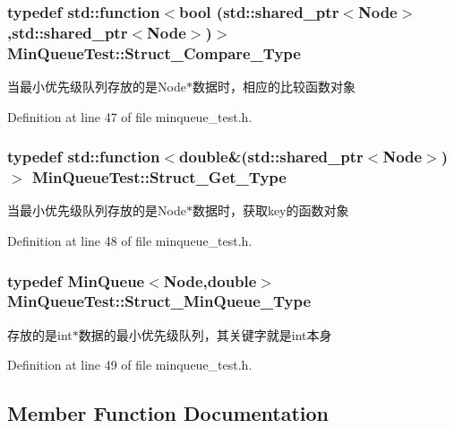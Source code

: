 \subsubsection[{Struct\+\_\+\+Compare\+\_\+\+Type}]{\setlength{\rightskip}{0pt plus 5cm}typedef std\+::function$<$bool (std\+::shared\+\_\+ptr$<${\bf Node}$>$,std\+::shared\+\_\+ptr$<${\bf Node}$>$)$>$ {\bf Min\+Queue\+Test\+::\+Struct\+\_\+\+Compare\+\_\+\+Type}}\label{class_min_queue_test_a25bfd5b74968c587db57133f107a5f61}
当最小优先级队列存放的是\+Node$\ast$数据时，相应的比较函数对象 

Definition at line 47 of file minqueue\+\_\+test.\+h.

\hypertarget{class_min_queue_test_aebcf6172ed7e9dd6f821fb1043f1cd6f}{}
\subsubsection[{Struct\+\_\+\+Get\+\_\+\+Type}]{\setlength{\rightskip}{0pt plus 5cm}typedef std\+::function$<$double\&(std\+::shared\+\_\+ptr$<${\bf Node}$>$)$>$ {\bf Min\+Queue\+Test\+::\+Struct\+\_\+\+Get\+\_\+\+Type}}\label{class_min_queue_test_aebcf6172ed7e9dd6f821fb1043f1cd6f}
当最小优先级队列存放的是\+Node$\ast$数据时，获取key的函数对象 

Definition at line 48 of file minqueue\+\_\+test.\+h.

\hypertarget{class_min_queue_test_a9b7e5e987d5e856adc5beb6986dd96a3}{}
\subsubsection[{Struct\+\_\+\+Min\+Queue\+\_\+\+Type}]{\setlength{\rightskip}{0pt plus 5cm}typedef {\bf Min\+Queue}$<${\bf Node},double$>$ {\bf Min\+Queue\+Test\+::\+Struct\+\_\+\+Min\+Queue\+\_\+\+Type}}\label{class_min_queue_test_a9b7e5e987d5e856adc5beb6986dd96a3}
存放的是int$\ast$数据的最小优先级队列，其关键字就是int本身 

Definition at line 49 of file minqueue\+\_\+test.\+h.



\subsection{Member Function Documentation}
\hypertarget{class_min_queue_test_ae801d45bf78b7bb80b278264d3a8e96a}{}
